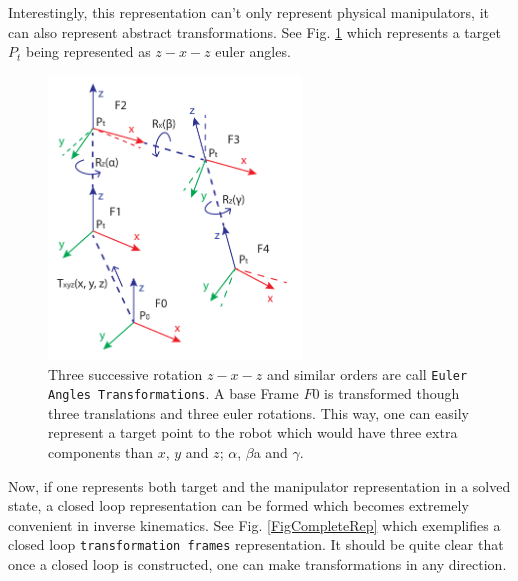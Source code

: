 {{        Interestingly, this representation can't only represent physical manipulators, it can also represent abstract transformations. See Fig. \ref{FigEulerRep} which represents a target $P_t$ being represented as $z-x-z$ euler angles.

        \begin{figure}
          \centering
          \includegraphics[width=0.6\textwidth]{EulerANgles.pdf}
          \caption{Three successive rotation $z-x-z$ and similar orders are call \texttt{Euler Angles Transformations}. A base Frame $F0$ is transformed though three translations and three euler rotations. This way, one can easily represent a target point to the robot which would have three extra components than $x$, $y$ and $z$; $\alpha$, $\beta$a and $\gamma$.
          } \label{FigEulerRep}
        \end{figure}

        Now, if one represents both target and the manipulator representation in a solved state, a closed loop representation can be formed which becomes extremely convenient in inverse kinematics. See Fig. \ref{FigCompleteRep} which exemplifies a closed loop \texttt{transformation frames} representation. It should be quite clear that once a closed loop is constructed, one can make transformations in any direction.

}}

